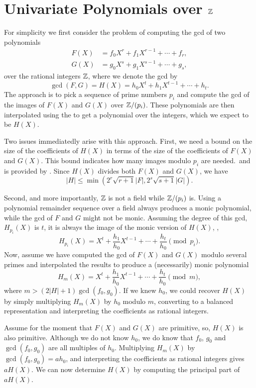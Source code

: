 \section{Univariate Polynomials over \texorpdfstring{$\mathbb{Z}$}{Z}}
\label{PGCD:Uni:Sec}

For simplicity we first consider the problem of computing the {\sc gcd} 
of two polynomials 
\[
\begin{aligned}
F(X) & = f_0 X^r + f_1 X^{r-1} + \cdots + f_r, \\
G(X) & = g_0 X^s + g_1 X^{s-1} + \cdots + g_s, 
\end{aligned}
\]
over the rational integers $\mathbb{Z}$,
where we denote the {\sc gcd} by 
\[
\gcd(F, G) = H(X) = h_0 X^t + h_1 X^{t-1} + \cdots + h_t.
\]  
The approach is to pick a sequence of prime numbers $p_i$ and compute the 
{\sc gcd} of the images of $F(X)$ and $G(X)$ over $\mathbb{Z}/(p_i)$.  These 
polynomials are then interpolated using the  to 
get a polynomial over the integers, which we expect to be $H(X)$. 

Two issues immediatedly arise with this approach.  First, we need a
bound on the size of the coefficients of $H(X)$ in terms of the size
of the coefficients of $F(X)$ and $G(X)$.  This bound indicates how many 
images modulo $p_i$ are needed.\, and is provided by 
.  Since $H(X)$ 
divides both $F(X)$ and $G(X)$, we have
\[
|H| \le \min( 2^r\sqrt{r+1} |F|, 2^s\sqrt{s+1} |G|).
\]

Second, and more importantly, $\mathbb{Z}$ is not a field while $\mathbb{Z}/(p_i)$ is.
Using a polynomial remainder sequence over a field always produces a
monic polynomial, while the {\sc gcd} of $F$ and $G$ might not be
monic.  Assuming the degree of this {\sc gcd}, $H_{p_i}(X)$ is $t$, it
is always the image of the monic version of $H(X)$, \ie,
\[
H_{p_i}(X) = X^t + \frac{h_1}{h_0} X^{t-1} + \cdots + \frac{h_t}{h_0}
    \pmod{p_i}.
\]
Now, assume we have computed the {\sc gcd} of $F(X)$ and $G(X)$ modulo
several primes and interpolated the results to produce a (necessarily) monic
polynomial
\[
H_m(X) = X^t + \frac{h_1}{h_0} X^{t-1} + \cdots + \frac{h_t}{h_0} \pmod{m},
\]
where $m > (2 |H| + 1) \gcd(f_0, g_0)$.  If we knew $h_0$, we could
recover $H(X)$ by simply multiplying $H_m(X)$ by $h_0$ modulo $m$,
converting to a balanced representation and interpreting the
coefficients as rational integers.

Assume for the moment that $F(X)$ and $G(X)$ are primitive, so, $H(X)$
is also primitive.  Although we do not know $h_0$, we do know that
$f_0$, $g_0$ and $\gcd(f_0, g_0)$ are all multiples of $h_0$.
Multiplying $H_m(X)$ by $\gcd(f_0, g_0) = a h_0$, and interpreting the
coefficients as rational integers gives $aH(X)$.  We can now determine
$H(X)$ by computing the principal part of $aH(X)$.

